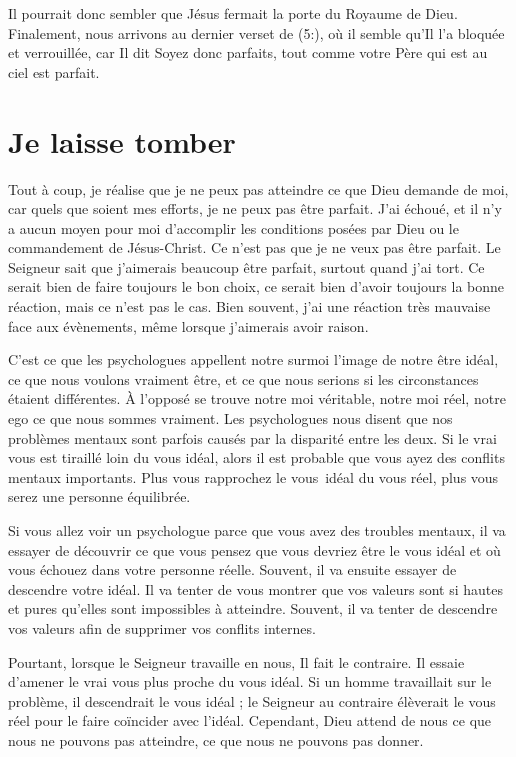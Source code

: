 Il pourrait donc sembler que Jésus fermait la porte du Royaume de Dieu.
 Finalement, nous arrivons au dernier verset de (5:),
 où il semble qu'Il l'a bloquée et verrouillée, car Il dit\frcolon{}
 \Og Soyez donc parfaits,
 tout comme votre Père qui est au ciel est parfait. \Fg{}


\section{Je laisse tomber}

Tout à coup, je réalise que je ne peux pas atteindre
 ce que Dieu demande de moi, car quels que soient mes efforts,
 je ne peux pas être parfait.
 J'ai échoué, et il n'y a aucun moyen pour moi d'accomplir
 les conditions posées par Dieu ou le commandement de Jésus-Christ.
 Ce n'est pas que je ne veux pas être parfait.
 Le Seigneur sait que j'aimerais beaucoup être parfait,
 surtout quand j'ai tort.
 Ce serait bien de faire toujours le bon choix,
 ce serait bien d'avoir toujours la bonne réaction,
 mais ce n'est pas le cas.
 Bien souvent, j'ai une réaction très mauvaise face aux évènements,
 même lorsque j'aimerais avoir raison.

C'est ce que les psychologues appellent notre surmoi
 \ocadr l'image de notre être idéal, ce que nous voulons vraiment être,
 et ce que nous serions si les circonstances étaient différentes.
 À l'opposé se trouve notre moi véritable, notre moi réel, notre ego
 \ocadr ce que nous sommes vraiment.
 Les psychologues nous disent que nos problèmes mentaux
 sont parfois causés par la disparité entre les deux.
 Si le vrai vous est tiraillé loin du vous idéal, alors il est probable
 que vous ayez des conflits mentaux importants.
 Plus vous rapprochez le vous~idéal du vous réel,
 plus vous serez une personne équilibrée.

Si vous allez voir un psychologue parce que vous avez des troubles mentaux,
 il va essayer de découvrir ce que vous pensez que vous devriez être
 \ocadr le vous idéal \fcadr{}
 et où vous échouez dans votre personne réelle.
 Souvent, il va ensuite essayer de descendre votre idéal.
 Il va tenter de vous montrer que vos valeurs sont si hautes et pures
 qu'elles sont impossibles à atteindre.
 Souvent, il va tenter de descendre vos valeurs
 afin de supprimer vos conflits internes.

Pourtant, lorsque le Seigneur travaille en nous, Il fait le contraire.
 Il essaie d'amener le vrai vous plus proche du vous idéal.
 Si un homme travaillait sur le problème, il descendrait le vous idéal ;
 le Seigneur au contraire élèverait le vous réel
 pour le faire coïncider avec l'idéal.
 Cependant, Dieu attend de nous ce que nous ne pouvons pas atteindre,
 ce que nous ne pouvons pas donner.


